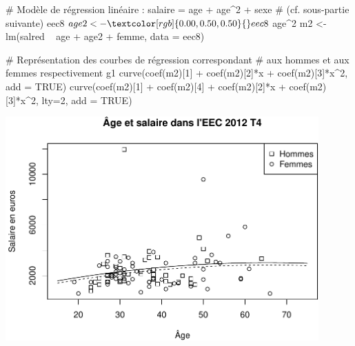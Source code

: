 \documentclass[12pt,twosided, notitlepage]{book}
\newenvironment{Shaded}{}{}
\newcommand{\KeywordTok}[1]{\textcolor[rgb]{0.00,0.00,1.00}{#1}}
\newcommand{\DataTypeTok}[1]{#1}
\newcommand{\DecValTok}[1]{#1}
\newcommand{\StringTok}[1]{\textcolor[rgb]{0.00,0.50,0.50}{#1}}
\newcommand{\CommentTok}[1]{\textcolor[rgb]{0.00,0.50,0.00}{#1}}
\newcommand{\OtherTok}[1]{\textcolor[rgb]{1.00,0.25,0.00}{#1}}
\newcommand{\OperatorTok}[1]{#1}
\newcommand{\NormalTok}[1]{#1}
\renewenvironment{Shaded}{\begin{snugshade}}{\end{snugshade}}
\begin{document}
\begin{Shaded}
\begin{Highlighting}[]
\CommentTok{# Modèle de régression linéaire : salaire = age + age^2 + sexe}
\CommentTok{# (cf. sous-partie suivante)}
\NormalTok{eec8}\OperatorTok{$}\NormalTok{age2 <-}\StringTok{ }\NormalTok{eec8}\OperatorTok{$}\NormalTok{age}\OperatorTok{^}\DecValTok{2}
\NormalTok{m2 <-}\StringTok{ }\KeywordTok{lm}\NormalTok{(salred }\OperatorTok{~}\StringTok{ }\NormalTok{age }\OperatorTok{+}\StringTok{ }\NormalTok{age2 }\OperatorTok{+}\StringTok{ }\NormalTok{femme, }\DataTypeTok{data =}\NormalTok{ eec8)}

\CommentTok{# Représentation des courbes de régression correspondant}
\CommentTok{# aux hommes et aux femmes respectivement}
\NormalTok{g1}
\KeywordTok{curve}\NormalTok{(}\KeywordTok{coef}\NormalTok{(m2)[}\DecValTok{1}\NormalTok{] }\OperatorTok{+}\StringTok{ }\KeywordTok{coef}\NormalTok{(m2)[}\DecValTok{2}\NormalTok{]}\OperatorTok{*}\NormalTok{x }\OperatorTok{+}\StringTok{ }\KeywordTok{coef}\NormalTok{(m2)[}\DecValTok{3}\NormalTok{]}\OperatorTok{*}\NormalTok{x}\OperatorTok{^}\DecValTok{2}\NormalTok{, }\DataTypeTok{add =} \OtherTok{TRUE}\NormalTok{)}
\KeywordTok{curve}\NormalTok{(}\KeywordTok{coef}\NormalTok{(m2)[}\DecValTok{1}\NormalTok{] }\OperatorTok{+}\StringTok{ }\KeywordTok{coef}\NormalTok{(m2)[}\DecValTok{4}\NormalTok{] }\OperatorTok{+}\StringTok{ }\KeywordTok{coef}\NormalTok{(m2)[}\DecValTok{2}\NormalTok{]}\OperatorTok{*}\NormalTok{x }\OperatorTok{+}\StringTok{ }\KeywordTok{coef}\NormalTok{(m2)[}\DecValTok{3}\NormalTok{]}\OperatorTok{*}\NormalTok{x}\OperatorTok{^}\DecValTok{2}\NormalTok{, }\DataTypeTok{lty=}\DecValTok{2}\NormalTok{, }\DataTypeTok{add =} \OtherTok{TRUE}\NormalTok{)}
\end{Highlighting}
\end{Shaded}

\begin{center}\includegraphics[width=12cm]{livret_files/figure-latex/unnamed-chunk-440-1} \end{center}
\end{document}
